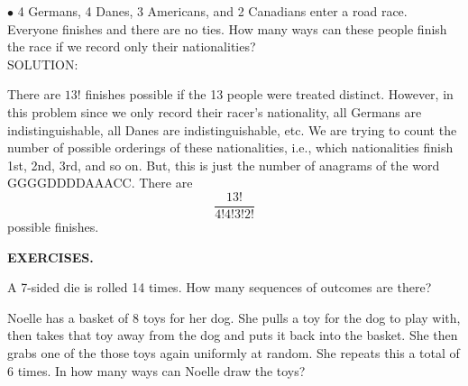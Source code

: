 \documentclass[12pt]{article}
\begin{document}
\bigskip


\noindent $\bullet$ 4 Germans, 4 Danes, 3 Americans, and 2 Canadians enter a road race. Everyone finishes and there are no ties.
How many ways can these people finish the race if we record only their nationalities?\\

\noindent SOLUTION:

There are $13!$ finishes possible if the 13 people were treated distinct. However, in this problem since we only record their racer's nationality, all Germans are indistinguishable, all Danes are indistinguishable, etc. We are trying to count the number of possible orderings of these nationalities, i.e., which nationalities finish 1st, 2nd, 3rd, and so on.
But, this is just the number of anagrams of the word GGGGDDDDAAACC. There are
$$\dfrac {13!}{4!4!3!2!}$$
\noindent possible finishes.









\newpage





\begin{center}{\bf \Large EXERCISES.}\label{problemset1}\end{center}


 A 7-sided die is rolled 14 times. How many sequences of outcomes are there?\medskip


 Noelle has a basket of 8 toys for her dog. She pulls a toy for the dog to play with, then takes that toy away from the dog and puts it back into the basket.
She then grabs one of the those toys again uniformly at random. She repeats this a total of 6 times. In how many ways can Noelle draw the toys?\medskip
\end{document}
